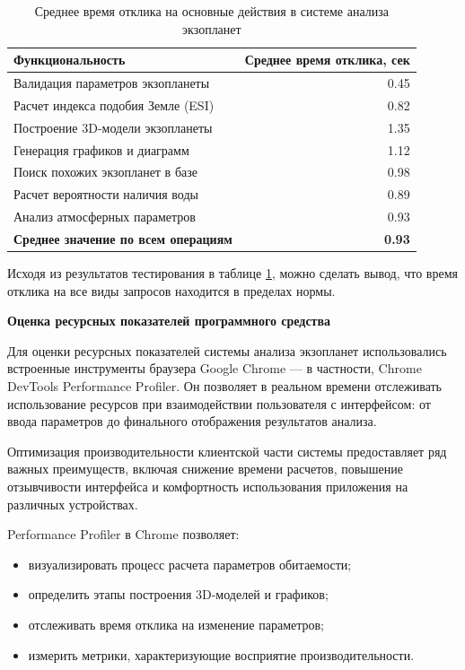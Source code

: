 \begin{table}[H]
\caption{Среднее время отклика на основные действия в системе анализа экзопланет\label{time}}
\centering
\begin{tabular}{|p{9cm}|r|}
    \hline
    \textbf{Функциональность} & \textbf{Среднее время отклика, сек} \\
    \hline
    Валидация параметров экзопланеты & 0.45 \\
    \hline
    Расчет индекса подобия Земле (ESI) & 0.82 \\
    \hline
    Построение 3D-модели экзопланеты & 1.35 \\
    \hline
    Генерация графиков и диаграмм & 1.12 \\
    \hline
    Поиск похожих экзопланет в базе & 0.98 \\
    \hline
    Расчет вероятности наличия воды & 0.89 \\
    \hline
    Анализ атмосферных параметров & 0.93 \\
    \hline
    \textbf{Среднее значение по всем операциям} & \textbf{0.93} \\
    \hline
\end{tabular}
\end{table}

Исходя из результатов тестирования в таблице \ref{time}, можно сделать вывод, что время 
отклика на все виды запросов находится в пределах нормы.

\textbf{Оценка ресурсных показателей программного средства}

Для оценки ресурсных показателей системы анализа экзопланет использовались встроенные инструменты браузера Google Chrome — в частности, Chrome DevTools Performance Profiler. Он позволяет в реальном времени отслеживать использование ресурсов при взаимодействии пользователя с интерфейсом: от ввода параметров до финального отображения результатов анализа.

Оптимизация производительности клиентской части системы предоставляет ряд важных преимуществ, включая снижение времени расчетов, повышение отзывчивости интерфейса и комфортность использования приложения на различных устройствах.

Performance Profiler в Chrome позволяет:
\begin{itemize}
    \item визуализировать процесс расчета параметров обитаемости;
    \item определить этапы построения 3D-моделей и графиков;
    \item отслеживать время отклика на изменение параметров;
    \item измерить метрики, характеризующие восприятие производительности.
\end{itemize}

